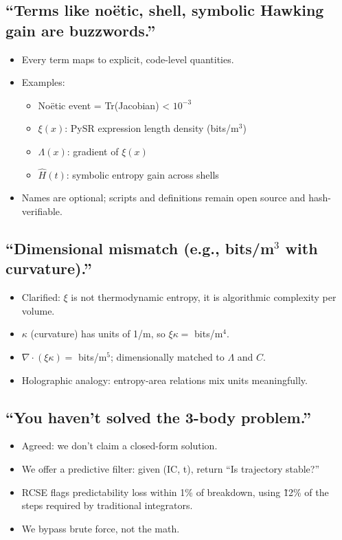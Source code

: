 \documentclass[12pt]{article}
\begin{document}
\subsection*{``Terms like noëtic, shell, symbolic Hawking gain are buzzwords.''}
\begin{itemize}
\item Every term maps to explicit, code-level quantities.
\item Examples:
\begin{itemize}
  \item Noëtic event = Tr(Jacobian) < \( 10^{-3} \)
  \item \( \xi(x) \): PySR expression length density (bits/m\(^3\))
  \item \( \Lambda(x) \): gradient of \( \xi(x) \)
  \item \( \hat{H}(t) \): symbolic entropy gain across shells
\end{itemize}
\item Names are optional; scripts and definitions remain open source and hash-verifiable.
\end{itemize}

\subsection*{``Dimensional mismatch (e.g., bits/m\(^3\) with curvature).''}
\begin{itemize}
\item Clarified: \( \xi \) is not thermodynamic entropy, it is algorithmic complexity per volume.
\item \( \kappa \) (curvature) has units of 1/m, so \( \xi \kappa = \) bits/m\(^4\).
\item \( \nabla \cdot (\xi \kappa) = \) bits/m\(^5\); dimensionally matched to \( \Lambda \) and \( C \).
\item Holographic analogy: entropy-area relations mix units meaningfully.
\end{itemize}

\subsection*{``You haven’t solved the 3-body problem.''}
\begin{itemize}
\item Agreed: we don’t claim a closed-form solution.
\item We offer a predictive filter: given (IC, t), return ``Is trajectory stable?''
\item RCSE flags predictability loss within 1\% of breakdown, using \~12\% of the steps required by traditional integrators.
\item We bypass brute force, not the math.
\end{itemize}
\end{document}
